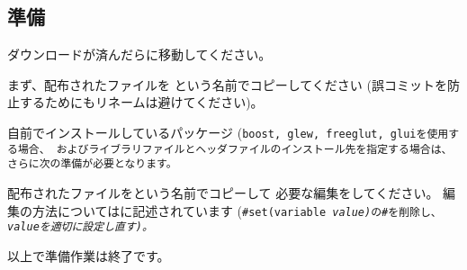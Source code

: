 \subsection{準備}
\label{subsec:PrepareLibrary}

\noindent
ダウンロードが済んだらに移動してください。

まず、配布されたファイルを
\CMakeLists{}という名前でコピーしてください
(誤コミットを防止するためにもリネームは避けてください)。

\medskip
\begin{narrow}[15pt]
\end{narrow}

\medskip
自前でインストールしているパッケージ
(\tt{boost}, \tt{glew}, \tt{freeglut}, \tt{glui}を使用する場合、
およびライブラリファイルとヘッダファイルのインストール先を指定する場合は、
さらに次の準備が必要となります。

配布されたファイルを\CMakeConf{}という名前でコピーして
必要な編集をしてください。
編集の方法については\CMakeConf{}に記述されています
(\tt{\#set(variable \it{value})}の\tt{\#}を削除し、\it{value}を適切に設定し直す)。

\medskip
\begin{narrow}[15pt]
\end{narrow}

\medskip
\noindent
以上で準備作業は終了です。

